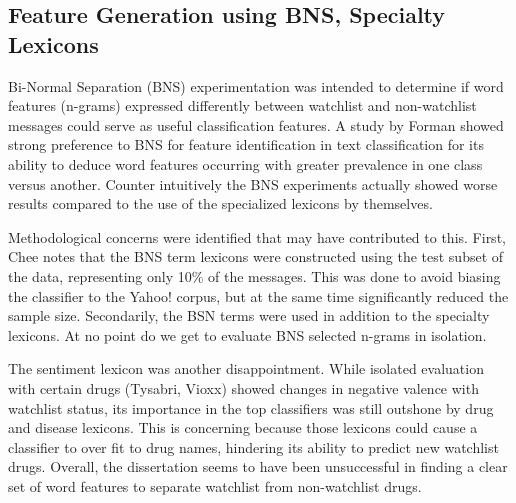 \documentclass[twoside,11pt]{article}
\begin{document}
\subsection{Feature Generation using BNS, Specialty Lexicons}
Bi-Normal Separation (BNS) experimentation was intended to determine if word features (n-grams) expressed differently between watchlist and non-watchlist messages could serve as useful classification features. A study by Forman \citep{Forman} showed strong preference to BNS for feature identification in text classification for its ability to deduce word features occurring with greater prevalence in one class versus another. Counter intuitively the BNS experiments actually showed worse results compared to the use of the specialized lexicons by themselves.
\par Methodological concerns were identified that may have contributed to this. First, Chee notes that the BNS term lexicons were constructed using the test subset of the data, representing only 10\% of the messages. This was done to avoid biasing the classifier to the Yahoo! corpus, but at the same time significantly reduced the sample size. Secondarily, the BSN terms were used in addition to the specialty lexicons. At no point do we get to evaluate BNS selected n-grams in isolation.
\par The sentiment lexicon was another disappointment. While isolated evaluation with certain drugs (Tysabri, Vioxx) showed changes in negative valence with watchlist status, its importance in the top classifiers was still outshone by drug and disease lexicons. This is concerning because those lexicons could cause a classifier to over fit to drug names, hindering its ability to predict new watchlist drugs. Overall, the dissertation seems to have been unsuccessful in finding a clear set of word features to separate watchlist from non-watchlist drugs.
\end{document}
